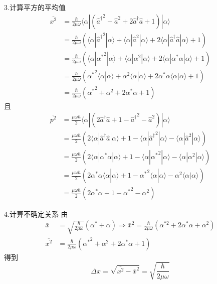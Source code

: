 3.计算平方的平均值
\begin{equation}
    \begin{aligned}
        \overline{x^2}&=\frac{\hbar}{2\mu \omega}\langle \alpha |\left( {\hat{a}^{\dagger}}^2+\hat{a}^2+2\hat{a}^{\dagger}\hat{a}+1 \right) |\alpha \rangle 
\\
&=\frac{\hbar}{2\mu \omega}\left( \langle \alpha |{\hat{a}^{\dagger}}^2|\alpha \rangle +\langle \alpha |\hat{a}^2|\alpha \rangle +2\langle \alpha |\hat{a}^{\dagger}\hat{a}|\alpha \rangle +1 \right) 
\\
&=\frac{\hbar}{2\mu \omega}\left( \langle \alpha |{\alpha ^*}^2|\alpha \rangle +\langle \alpha |\alpha ^2|\alpha \rangle +2\langle \alpha |\alpha ^*\alpha |\alpha \rangle +1 \right) 
\\
&=\frac{\hbar}{2\mu \omega}\left( {\alpha ^*}^2\langle \alpha |\alpha \rangle +\alpha ^2\langle \alpha |\alpha \rangle +2\alpha ^*\alpha \langle \alpha |\alpha \rangle +1 \right) 
\\
&=\frac{\hbar}{2\mu \omega}\left( {\alpha ^*}^2+\alpha ^2+2\alpha ^*\alpha +1 \right) 
    \end{aligned}
\end{equation}
且
\begin{equation}
    \begin{aligned}
        \overline{p^2}&=\frac{\mu \omega \hbar}{2}\langle \alpha |\left( 2\hat{a}^{\dagger}\hat{a}+1-{\hat{a}^{\dagger}}^2-\hat{a}^2 \right) |\alpha \rangle 
\\
&=\frac{\mu \omega \hbar}{2}\left( 2\langle \alpha |\hat{a}^{\dagger}\hat{a}|\alpha \rangle +1-\langle \alpha |{\hat{a}^{\dagger}}^2|\alpha \rangle -\langle \alpha |\hat{a}^2|\alpha \rangle \right) 
\\
&=\frac{\mu \omega \hbar}{2}\left( 2\langle \alpha |\alpha ^*\alpha |\alpha \rangle +1-\langle \alpha |{\alpha ^*}^2|\alpha \rangle -\langle \alpha |\alpha ^2|\alpha \rangle \right) 
\\
&=\frac{\mu \omega \hbar}{2}\left( 2\alpha ^*\alpha \langle \alpha |\alpha \rangle +1-{\alpha ^*}^2\langle \alpha |\alpha \rangle -\alpha ^2\langle \alpha |\alpha \rangle \right) 
\\
&=\frac{\mu \omega \hbar}{2}\left( 2\alpha ^*\alpha +1-{\alpha ^*}^2-\alpha ^2 \right) 
    \end{aligned}
\end{equation}

4.计算不确定关系
由
\begin{equation}
    \begin{aligned}
        \bar{x}&=\sqrt{\frac{\hbar}{2\mu \omega}}\left( \alpha ^*+\alpha \right) \Rightarrow \bar{x}^2=\frac{\hbar}{2\mu \omega}\left( \alpha ^{*2}+2\alpha ^*\alpha +\alpha ^2 \right) 
\\
\overline{x^2}&=\frac{\hbar}{2\mu \omega}\left( {\alpha ^*}^2+\alpha ^2+2\alpha ^*\alpha +1 \right) 
    \end{aligned}
\end{equation}
得到
\begin{equation}
    \Delta x=\sqrt{\overline{x^2}-\bar{x}^2}=\sqrt{\frac{\hbar}{2\mu \omega}}
\end{equation}

